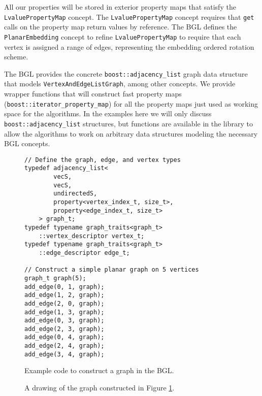 \documentclass[letterpaper, 12pt]{article}
\theoremstyle{thm}
\begin{document}
All our properties will be stored in exterior property maps that satisfy the
\texttt{Lvalue{\allowbreak}Property{\allowbreak}Map} concept. The \texttt{Lvalue{\allowbreak}Property{\allowbreak}Map} concept requires
that \texttt{get} calls on the property map return values by reference.
The BGL defines the \texttt{PlanarEmbedding} concept to refine
\texttt{Lvalue{\allowbreak}Property{\allowbreak}Map} to require that each vertex is assigned a range of
edges, representing the embedding ordered rotation scheme.

The BGL provides the concrete \texttt{boost::adjacency\_list} graph data structure that
models \texttt{VertexAndEdgeListGraph}, among other concepts. We provide wrapper
functions that will construct fast property maps (\texttt{boost::iterator\_property\_map})
for all the property maps just used as working space for the algorithms.
In the examples here we will only discuss \texttt{boost::adjacency\_list} structures,
but functions are available in the library to allow the algorithms to work on
arbitrary data structures modeling the necessary BGL concepts.

\begin{figure}
\begin{lstlisting}[frame=single]
// Define the graph, edge, and vertex types
typedef adjacency_list<
        vecS,
        vecS,
        undirectedS,
        property<vertex_index_t, size_t>,
        property<edge_index_t, size_t>
    > graph_t;
typedef typename graph_traits<graph_t>
    ::vertex_descriptor vertex_t;
typedef typename graph_traits<graph_t>
    ::edge_descriptor edge_t;

// Construct a simple planar graph on 5 vertices
graph_t graph(5);
add_edge(0, 1, graph);
add_edge(1, 2, graph);
add_edge(2, 0, graph);
add_edge(1, 3, graph);
add_edge(0, 3, graph);
add_edge(2, 3, graph);
add_edge(0, 4, graph);
add_edge(2, 4, graph);
add_edge(3, 4, graph);
\end{lstlisting}
\caption{Example code to construct a graph in the BGL.}
\label{example_make_graph}
\end{figure}

\begin{figure}
\begin{center}
\end{center}
\caption{A drawing of the graph constructed in Figure \ref{example_make_graph}.}
\end{figure}
\end{document}
